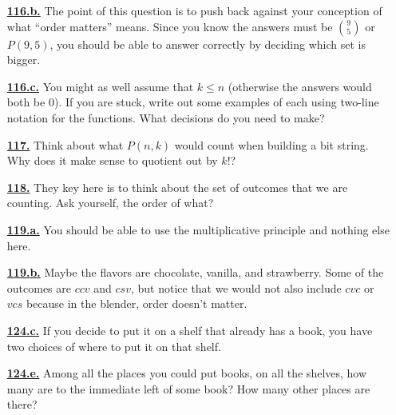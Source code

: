 \documentclass[10pt,]{book}
\theoremstyle{plain}
\theoremstyle{definition}
\theoremstyle{definition}
\theoremstyle{definition}
\numberwithin{equation}{chapter}
\begin{document}
\begin{itemize}[itemsep=1em]
\hypertarget{a-116.b}{}\item[\textbf{\hyperref[task-150]{116.b.}}]
\hypertarget{p-796}{}%
The point of this question is to push back against your conception of what ``order matters'' means.  Since you know the answers must be \(\binom{9}{5}\) or \(P(9,5)\), you should be able to answer correctly by deciding which set is bigger.%

\hypertarget{a-116.c}{}\item[\textbf{\hyperref[task-151]{116.c.}}]
\hypertarget{p-798}{}%
You might as well assume that \(k \le n\) (otherwise the answers would both be 0).  If you are stuck, write out some examples of each using two-line notation for the functions.  What decisions do you need to make?%

\hypertarget{a-117}{}\item[\textbf{\hyperref[activity-110]{117.}}]
\hypertarget{p-800}{}%
Think about what \(P(n,k)\) would count when building a bit string.  Why does it make sense to quotient out by \(k!\)?%

\hypertarget{a-118}{}\item[\textbf{\hyperref[activity-111]{118.}}]
\hypertarget{p-802}{}%
They key here is to think about the set of outcomes that we are counting.  Ask yourself, the order of what?%

\hypertarget{a-119.a}{}\item[\textbf{\hyperref[task-152]{119.a.}}]
\hypertarget{p-805}{}%
You should be able to use the multiplicative principle and nothing else here.%

\hypertarget{a-119.b}{}\item[\textbf{\hyperref[task-153]{119.b.}}]
\hypertarget{p-807}{}%
Maybe the flavors are chocolate, vanilla, and strawberry.  Some of the outcomes are \(ccv\) and \(csv\), but notice that we would not also include \(cvc\) or \(vcs\) because in the blender, order doesn't matter.%

\hypertarget{a-124.c}{}\item[\textbf{\hyperref[task-165]{124.c.}}]
\hypertarget{p-834}{}%
If you decide to put it on a shelf that already has a book, you have two choices of where to put it on that shelf.%

\hypertarget{a-124.e}{}\item[\textbf{\hyperref[task-167]{124.e.}}]
\hypertarget{p-839}{}%
Among all the places you could put books, on all the shelves, how many are to the immediate left of some book? How many other places are there?%


\end{itemize}
\end{document}
